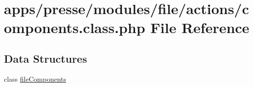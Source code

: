 \hypertarget{presse_2modules_2file_2actions_2components_8class_8php}{\section{apps/presse/modules/file/actions/components.class.\-php File Reference}
\label{presse_2modules_2file_2actions_2components_8class_8php}
}
\subsection*{Data Structures}
\begin{DoxyCompactItemize}
\item 
class \hyperlink{classfile_components}{file\-Components}
\end{DoxyCompactItemize}
